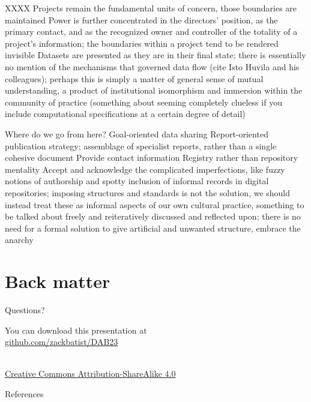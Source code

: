 \documentclass{beamer}
\begin{document}
\begin{frame}{XXXX}
  Projects remain the fundamental units of concern, those boundaries are maintained
  Power is further concentrated in the directors' position, as the primary contact, and as the recognized owner and controller of the totality of a project's information; the boundaries within a project tend to be rendered invisible
  Datasets are presented as they are in their final state; there is essentially no mention of the mechanisms that governed data flow (cite Isto Huvila and his colleagues); perhaps this is simply a matter of general sense of mutual understanding, a product of institutional isomorphism and immersion within the community of practice (something about seeming completely clueless if you include computational specifications at a certain degree of detail)

\end{frame}

\begin{frame}{Where do we go from here?}
  Goal-oriented data sharing
  Report-oriented publication strategy; assemblage of specialist reports, rather than a single cohesive document
  Provide contact information
  Registry rather than repository mentality
  Accept and acknowledge the complicated imperfections, like fuzzy notions of authorship and spotty inclusion of informal records in digital repositories; imposing structures and standards is not the solution, we should instead treat these as informal aspects of our own cultural practice, something to be talked about freely and reiteratively discussed and reflected upon; there is no need for a formal solution to give artificial and unwanted structure, embrace the anarchy


\end{frame}

\section*{Back matter}

\begin{frame}[standout]
  Questions?
\end{frame}

\begin{frame}
  
\begin{center}You can download this presentation at\\
\url{github.com/zackbatist/DAB23}\end{center}

\begin{center}\doclicenseImage[imagewidth=2cm]\\
\footnotesize \href{http://creativecommons.org/licenses/by-sa/4.0/}{Creative Commons Attribution-ShareAlike 4.0}\end{center}



\end{frame}

\begin{frame}{References}
  
  
\end{frame}
\end{document}
